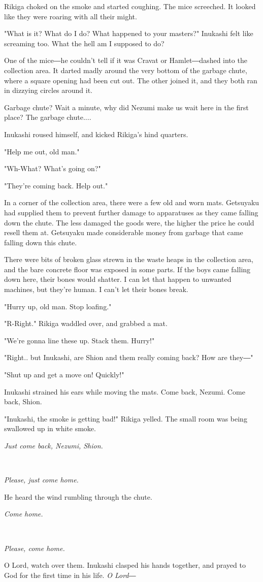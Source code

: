Rikiga choked on the smoke and started coughing. The mice screeched. It
looked like they were roaring with all their might.

"What is it? What do I do? What happened to your masters?" Inukashi felt
like screaming too. What the hell am I supposed to do?

One of the mice―he couldn't tell if it was Cravat or Hamlet―dashed into
the collection area. It darted madly around the very bottom of the
garbage chute, where a square opening had been cut out. The other joined
it, and they both ran in dizzying circles around it.

Garbage chute? Wait a minute, why did Nezumi make us wait here in the
first place? The garbage chute....

Inukashi roused himself, and kicked Rikiga's hind quarters.

"Help me out, old man."

"Wh-What? What's going on?"

"They're coming back. Help out."

In a corner of the collection area, there were a few old and worn mats.
Getsuyaku had supplied them to prevent further damage to apparatuses as
they came falling down the chute. The less damaged the goods were, the
higher the price he could resell them at. Getsuyaku made considerable
money from garbage that came falling down this chute.

There were bits of broken glass strewn in the waste heaps in the
collection area, and the bare concrete floor was exposed in some parts.
If the boys came falling down here, their bones would shatter. I can let
that happen to unwanted machines, but they're human. I can't let their
bones break.

"Hurry up, old man. Stop loafing."

"R-Right." Rikiga waddled over, and grabbed a mat.

"We're gonna line these up. Stack them. Hurry!"

"Right.. but Inukashi, are Shion and them really coming back? How are
they―"

"Shut up and get a move on! Quickly!"

Inukashi strained his ears while moving the mats. Come back, Nezumi.
Come back, Shion.

"Inukashi, the smoke is getting bad!" Rikiga yelled. The small room was
being swallowed up in white smoke.

\emph{Just come back, Nezumi, Shion.}

\emph{\\
}

\emph{Please, just come home.}

He heard the wind rumbling through the chute.

\emph{Come home.}

\emph{\\
}

\emph{Please, come home.}

O Lord, watch over them. Inukashi clasped his hands together, and prayed
to God for the first time in his life. \emph{O Lord―}
